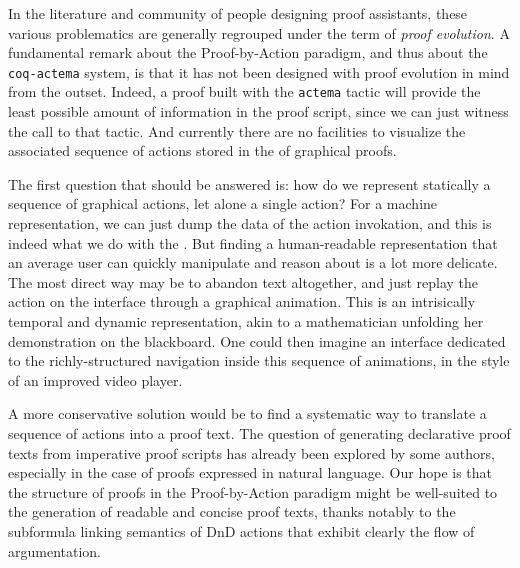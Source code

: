 In the literature and community of people designing proof assistants, these
various problematics are generally regrouped under the term of \emph{proof
evolution}. A fundamental remark about the Proof-by-Action paradigm, and thus
about the \texttt{coq-actema} system, is that it has not been designed with
proof evolution in mind from the outset. Indeed, a proof built with the
\texttt{actema} tactic will provide the least possible amount of information in
the proof script, since we can just witness the call to that tactic. And
currently there are no facilities to visualize the associated sequence of
actions stored in the  of graphical proofs.

The first question that should be answered is: how do we represent statically a
sequence of graphical actions, let alone a single action? For a machine
representation, we can just dump the data of the action invokation, and this is
indeed what we do with the . But finding a human-readable
representation that an average user can quickly manipulate and reason about is a
lot more delicate. The most direct way may be to abandon text altogether, and
just replay the action on the interface through a graphical animation. This is
an intrisically temporal and dynamic representation, akin to a mathematician
unfolding her demonstration on the blackboard. One could then imagine an
interface dedicated to the richly-structured navigation inside this sequence of
animations, in the style of an improved video player.

A more conservative solution would be to find a systematic way to translate a
sequence of actions into a proof text. The question of generating declarative
proof texts from imperative proof scripts has already been explored by some
authors, especially in the case of proofs expressed in natural
language. Our hope is that the structure of proofs
in the Proof-by-Action paradigm might be well-suited to the generation of
readable and concise proof texts, thanks notably to the subformula linking
semantics of DnD actions that exhibit clearly the flow of argumentation.

